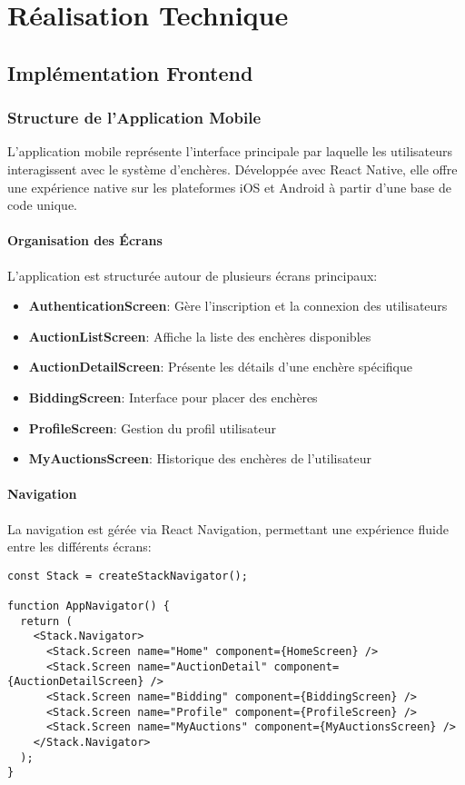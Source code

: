 \chapter{Réalisation Technique}

\section{Implémentation Frontend}

\subsection{Structure de l'Application Mobile}
L'application mobile représente l'interface principale par laquelle les utilisateurs interagissent avec le système d'enchères. Développée avec React Native, elle offre une expérience native sur les plateformes iOS et Android à partir d'une base de code unique.

\subsubsection{Organisation des Écrans}
L'application est structurée autour de plusieurs écrans principaux:

\begin{itemize}
    \item \textbf{AuthenticationScreen}: Gère l'inscription et la connexion des utilisateurs
    \item \textbf{AuctionListScreen}: Affiche la liste des enchères disponibles
    \item \textbf{AuctionDetailScreen}: Présente les détails d'une enchère spécifique
    \item \textbf{BiddingScreen}: Interface pour placer des enchères
    \item \textbf{ProfileScreen}: Gestion du profil utilisateur
    \item \textbf{MyAuctionsScreen}: Historique des enchères de l'utilisateur
\end{itemize}

\subsubsection{Navigation}
La navigation est gérée via React Navigation, permettant une expérience fluide entre les différents écrans:

\begin{verbatim}
const Stack = createStackNavigator();

function AppNavigator() {
  return (
    <Stack.Navigator>
      <Stack.Screen name="Home" component={HomeScreen} />
      <Stack.Screen name="AuctionDetail" component={AuctionDetailScreen} />
      <Stack.Screen name="Bidding" component={BiddingScreen} />
      <Stack.Screen name="Profile" component={ProfileScreen} />
      <Stack.Screen name="MyAuctions" component={MyAuctionsScreen} />
    </Stack.Navigator>
  );
}
\end{verbatim}


